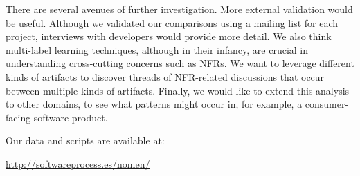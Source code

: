 \documentclass[]{sig-alternate}
\begin{document}
There are several avenues of further investigation.  
More external validation would be useful. 
Although we validated our comparisons using a mailing list for each project, interviews with developers would provide more detail. 
We also think multi-label learning techniques, although in their infancy, are crucial in understanding cross-cutting concerns such as NFRs. 
We want to leverage different kinds of artifacts to discover threads of NFR-related discussions that occur between multiple kinds of artifacts.
Finally, we would like to extend this analysis to other domains, to see what patterns might occur in, for example, a consumer-facing software product.
 

\appendix

Our data and scripts are available at:

 \url{http://softwareprocess.es/nomen/}


%

\end{document}
